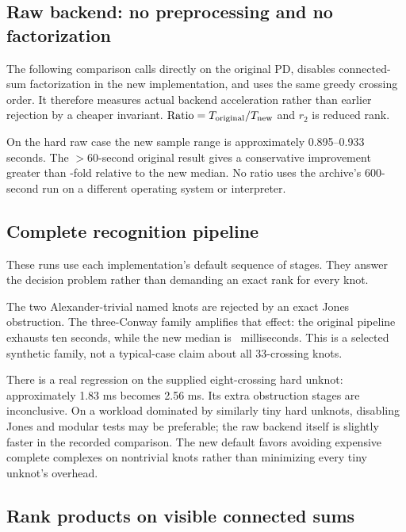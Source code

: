 \documentclass[11pt]{article}
\newcommand{\code}[1]{\texttt{\detokenize{#1}}}
\begin{document}
\subsection{Raw backend: no preprocessing and no factorization}

The following comparison calls \code{khovanov_rank} directly on the original
PD, disables connected-sum factorization in the new implementation, and uses
the same greedy crossing order. It therefore measures actual backend
acceleration rather than earlier rejection by a cheaper invariant.
$\text{Ratio}=T_{\rm original}/T_{\rm new}$ and $r_2$ is reduced rank.

\RawBenchmarkTable

On the hard raw case the new sample range is approximately 0.895--0.933 seconds.
The $>60$-second original result gives a conservative improvement greater than
\HardLowerSpeedup-fold relative to the new median. No ratio uses the archive's
600-second run on a different operating system or interpreter.

\subsection{Complete recognition pipeline}

These runs use each implementation's default sequence of stages. They answer
the decision problem rather than demanding an exact rank for every knot.

\PipelineBenchmarkTable

The two Alexander-trivial named knots are rejected by an exact Jones
obstruction. The three-Conway family amplifies that effect: the original
pipeline exhausts ten seconds, while the new median is
\ConwayThreeMilliseconds\ milliseconds. This is a selected synthetic family,
not a typical-case claim about all 33-crossing knots.

There is a real regression on the supplied eight-crossing hard unknot:
approximately 1.83 ms becomes 2.56 ms. Its extra obstruction stages are
inconclusive. On a workload dominated by similarly tiny hard unknots, disabling
Jones and modular tests may be preferable; the raw backend itself is slightly
faster in the recorded comparison. The new default favors avoiding expensive
complete complexes on nontrivial knots rather than minimizing every tiny
unknot's overhead.

\subsection{Rank products on visible connected sums}
\end{document}
